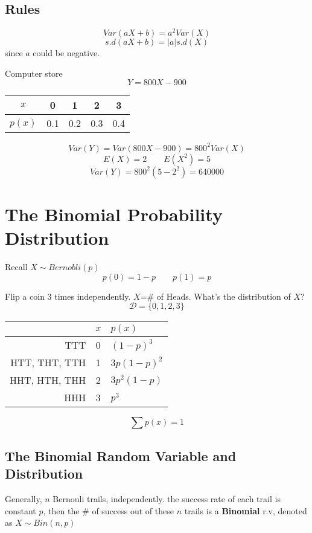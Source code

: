 \subsection{Rules}
\begin{prop}
\[Var(aX+b)=a^2 Var(X)\]
\[s.d(aX+b)=|a| s.d(X)\]
since $a$ could be negative.
\end{prop}

\begin{exmp}
Computer store
\[Y=800X-900\]

\begin{center}
\begin{tabular}{c|cccc}
\hline
$x$ & 0 & 1 & 2 & 3 \\
\hline
$p(x)$  & 0.1 & 0.2  & 0.3  & 0.4 \\
\hline
\end{tabular}
\end{center}

\[Var(Y)=Var(800X-900)=800^2 Var(X)\]
\[E(X)=2 \qquad E(X^2)=5\]
\[Var(Y)=800^2(5-2^2)=640000\]
\end{exmp}


\section{The Binomial Probability Distribution}
Recall $X \sim Bernobli(p)$
\[p(0)=1-p \qquad p(1)=p\]

\begin{exmp}
Flip a coin 3 times independently. 
$X$=\# of Heads. What's the distribution of $X$?
\[\mathcal{D}=\{0,1,2,3\}\]
\begin{center}
\begin{tabular}{r|c|l}
\hline
       &  $x$  & $p(x)$ \\
    \hline
    TTT & 0 & $(1-p)^3$ \\
    HTT, THT, TTH  & 1 & $3p(1-p)^2$ \\
    HHT, HTH, THH  & 2 & $3p^2 (1-p)$ \\
    HHH & 3 & $p^3$ \\
\hline
\end{tabular}
\[\sum p(x)=1\] 
\end{center}
\end{exmp}

\subsection{The Binomial Random Variable and Distribution}
Generally, $n$ Bernouli trails, independently. the success rate of each trail is constant $p$, then the \# of success out of these $n$ trails is a \textbf{Binomial} r.v, denoted as $X \sim Bin(n,p)$

